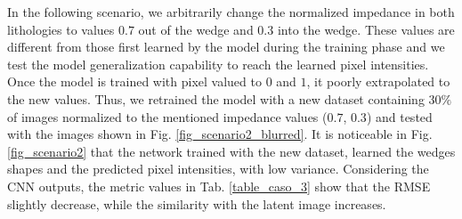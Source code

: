 \documentclass[conference]{IEEEtran}
\begin{document}
In the following scenario, we arbitrarily change the normalized impedance in both
lithologies to values $ 0.7 $ out of the wedge and $ 0.3$ into the wedge.
These values are different from those first learned by the model during the
training phase and we test the model generalization capability to reach
the learned pixel intensities. Once the model is trained with pixel valued to
$ 0 $ and $ 1 $, it poorly extrapolated to the new values. Thus, we retrained the model with a new dataset containing $30\%$
of images normalized to the mentioned impedance values ($0.7$, $0.3$) and tested with the images shown in Fig. \ref{fig_scenario2_blurred}. It is noticeable in Fig. \ref{fig_scenario2} that the network trained with the new dataset, learned
the wedges shapes and the predicted pixel intensities, with low variance. Considering the CNN outputs, the metric values in Tab. \ref{table_caso_3}
show that the RMSE slightly decrease, while the similarity with the latent image increases.
\end{document}
